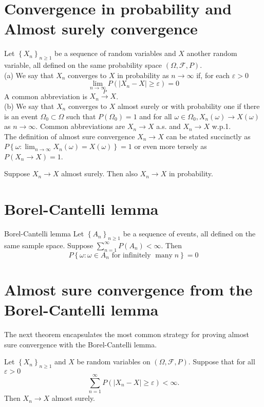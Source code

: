 \documentclass[11pt]{elegantbook}
\begin{document}
\section{Convergence in probability and Almost surely convergence}
\begin{definition}
Let $\left\{X_n\right\}_{n \geq 1}$ be a sequence of random variables and $X$ another random variable, all defined on the same probability space $(\Omega, \mathcal{F}, P)$.\\

(a) We say that $X_n$ converges to $X$ in probability as $n \rightarrow \infty$ if, for each $\varepsilon>0$
$$
\lim _{n \rightarrow \infty} P\left(\left|X_n-X\right| \geq \varepsilon\right)=0
$$
A common abbreviation is $X_n \stackrel{P}{\rightarrow} X$.\\

(b) We say that $X_n$ converges to $X$ almost surely or with probability one if there is an event $\Omega_0 \subset \Omega$ such that $P\left(\Omega_0\right)=1$ and for all $\omega \in \Omega_0, X_n(\omega) \rightarrow X(\omega)$ as $n \rightarrow \infty$. Common abbreviations are $X_n \rightarrow X$ a.s. and $X_n \rightarrow X$ w.p.1.\\
The definition of almost sure convergence $X_n \rightarrow X$ can be stated succinctly as $P\left\{\omega: \lim _{n \rightarrow \infty} X_n(\omega)=X(\omega)\right\}=1$ or even more tersely as $P\left(X_n \rightarrow X\right)=1$. 
\end{definition}

\begin{theorem}
Suppose $X_n \rightarrow X$ almost surely. Then also $X_n \rightarrow X$ in probability.
\end{theorem}
\section{Borel-Cantelli lemma}
\begin{lemma}{Borel-Cantelli lemma}
    Let $\left\{A_n\right\}_{n \geq 1}$ be a sequence of events, all defined on the same sample space. Suppose $\sum_{n=1}^{\infty} P\left(A_n\right)<\infty$. Then
    $$
    P\left\{\omega: \omega \in A_n \text { for infinitely } \operatorname{many} n\right\}=0
    $$ 
\end{lemma}

\section{Almost sure convergence from the Borel-Cantelli lemma}
The next theorem encapsulates the most common strategy for proving almost sure convergence with the Borel-Cantelli lemma.
\begin{theorem}
Let $\left\{X_n\right\}_{n \geq 1}$ and $X$ be random variables on $(\Omega, \mathcal{F}, P)$. Suppose that for all $\varepsilon>0$
$$
\sum_{n=1}^{\infty} P\left(\left|X_n-X\right| \geq \varepsilon\right)<\infty .
$$
Then $X_n \rightarrow X$ almost surely.
\end{theorem}
\end{document}
